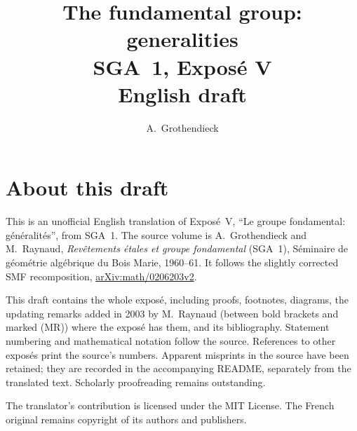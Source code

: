 \documentclass[11pt,a4paper,oneside]{amsbook}
\title[SGA~1, Expos\'e V (English draft)]{The fundamental group: generalities\\
{\normalsize SGA~1, Expos\'e V\\English draft}}
\author{A.\ Grothendieck}
\date{}
\begin{document}
\frontmatter
\maketitle

\chapter*{About this draft}
This is an unofficial English translation of Expos\'e~V,
``Le groupe fondamental: g\'en\'eralit\'es'', from SGA~1. The source volume is
A.\ Grothendieck and M.\ Raynaud,
\textit{Rev\^etements \'etales et groupe fondamental} (SGA~1),
S\'eminaire de g\'eom\'etrie alg\'ebrique du Bois Marie, 1960--61.
It follows the slightly corrected SMF recomposition,
\href{https://arxiv.org/abs/math/0206203v2}{arXiv:math/0206203v2}.

This draft contains the whole expos\'e, including proofs, footnotes,
diagrams, the updating remarks added in 2003 by M.~Raynaud (between bold
brackets and marked (MR)) where the expos\'e has them, and its bibliography.
Statement numbering and mathematical notation follow the source.
References to other expos\'es print the source's numbers. Apparent
misprints in the source have been retained; they are recorded in the
accompanying README, separately from the translated text. Scholarly
proofreading remains outstanding.

The translator's contribution is licensed under
the MIT License.
The French original remains copyright of its authors and publishers.

\tableofcontents
\mainmatter
\setcounter{chapter}{4}





\end{document}
